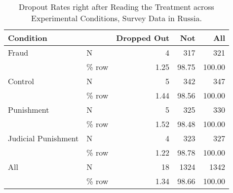 \begin{table}

\caption{Dropout Rates right after Reading the Treatment across Experimental Conditions,
Survey Data in Russia.}
\centering
\begin{tabular}[t]{llrrr}
\toprule
Condition &   & Dropped Out & Not & All\\
\midrule
Fraud & N & 4 & 317 & 321\\
 & \% row & 1.25 & 98.75 & 100.00\\
Control & N & 5 & 342 & 347\\
 & \% row & 1.44 & 98.56 & 100.00\\
Punishment & N & 5 & 325 & 330\\
 & \% row & 1.52 & 98.48 & 100.00\\
Judicial Punishment & N & 4 & 323 & 327\\
 & \% row & 1.22 & 98.78 & 100.00\\
All & N & 18 & 1324 & 1342\\
 & \% row & 1.34 & 98.66 & 100.00\\
\bottomrule
\end{tabular}
\end{table}
